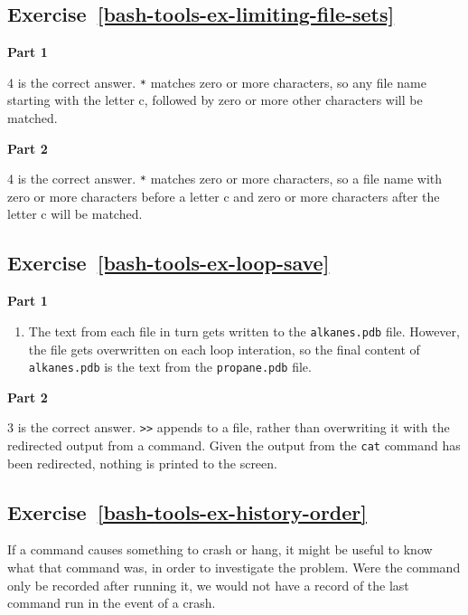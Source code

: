 \documentclass[
]{krantz}
\providecommand{\tightlist}{%
  \setlength{\itemsep}{0pt}\setlength{\parskip}{0pt}}
\begin{document}
\hypertarget{exercise-refbash-tools-ex-limiting-file-sets}{%
\subsection*{Exercise~\ref{bash-tools-ex-limiting-file-sets}}\label{exercise-refbash-tools-ex-limiting-file-sets}}


\textbf{Part 1}

4 is the correct answer. \texttt{*} matches zero or more characters, so any file name starting with
the letter c, followed by zero or more other characters will be matched.

\textbf{Part 2}

4 is the correct answer. \texttt{*} matches zero or more characters, so a file name with zero or more
characters before a letter c and zero or more characters after the letter c will be matched.

\hypertarget{exercise-refbash-tools-ex-loop-save}{%
\subsection*{Exercise~\ref{bash-tools-ex-loop-save}}\label{exercise-refbash-tools-ex-loop-save}}


\textbf{Part 1}

\begin{enumerate}
\def\labelenumi{\arabic{enumi}.}
\tightlist
\item
  The text from each file in turn gets written to the \texttt{alkanes.pdb} file.
  However, the file gets overwritten on each loop interation, so the final content of \texttt{alkanes.pdb}
  is the text from the \texttt{propane.pdb} file.
\end{enumerate}

\textbf{Part 2}

3 is the correct answer. \texttt{\textgreater{}\textgreater{}} appends to a file, rather than overwriting it with the redirected
output from a command.
Given the output from the \texttt{cat} command has been redirected, nothing is printed to the screen.

\hypertarget{exercise-refbash-tools-ex-history-order}{%
\subsection*{Exercise~\ref{bash-tools-ex-history-order}}\label{exercise-refbash-tools-ex-history-order}}


If a command causes something to crash or hang, it might be useful
to know what that command was, in order to investigate the problem.
Were the command only be recorded after running it, we would not
have a record of the last command run in the event of a crash.
\end{document}
